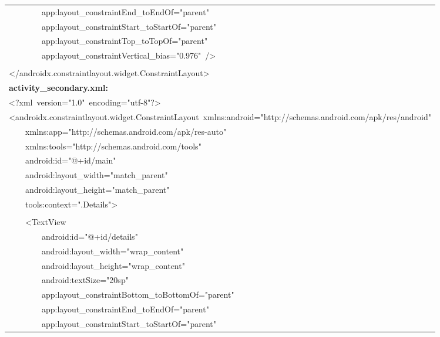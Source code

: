 \documentclass[a4paper,12pt]{article}
\begin{document}
\begin{longtable}{|p{}|}
{\ttfamily\small \ \ \ \ \ \ \ \ app:layout\_constraintEnd\_toEndOf="parent"} \\
{\ttfamily\small \ \ \ \ \ \ \ \ app:layout\_constraintStart\_toStartOf="parent"} \\
{\ttfamily\small \ \ \ \ \ \ \ \ app:layout\_constraintTop\_toTopOf="parent"} \\
{\ttfamily\small \ \ \ \ \ \ \ \ app:layout\_constraintVertical\_bias="0.976"\ /\textgreater{}} \\
\strut \\
{\ttfamily\small \textless{}/androidx.constraintlayout.widget.ConstraintLayout\textgreater{}} \\
\hline
\rule{0pt}{13pt}\textbf{activity\_secondary.xml:} \\
\hline
{\ttfamily\small \textless{}?xml\ version="1.0"\ encoding="utf-8"?\textgreater{}} \\
{\ttfamily\small \textless{}androidx.constraintlayout.widget.ConstraintLayout\ xmlns:android="http://schemas.android.com/apk/res/android"} \\
{\ttfamily\small \ \ \ \ xmlns:app="http://schemas.android.com/apk/res-auto"} \\
{\ttfamily\small \ \ \ \ xmlns:tools="http://schemas.android.com/tools"} \\
{\ttfamily\small \ \ \ \ android:id="@+id/main"} \\
{\ttfamily\small \ \ \ \ android:layout\_width="match\_parent"} \\
{\ttfamily\small \ \ \ \ android:layout\_height="match\_parent"} \\
{\ttfamily\small \ \ \ \ tools:context=".Details"\textgreater{}} \\
\strut \\
{\ttfamily\small \ \ \ \ \textless{}TextView} \\
{\ttfamily\small \ \ \ \ \ \ \ \ android:id="@+id/details"} \\
{\ttfamily\small \ \ \ \ \ \ \ \ android:layout\_width="wrap\_content"} \\
{\ttfamily\small \ \ \ \ \ \ \ \ android:layout\_height="wrap\_content"} \\
{\ttfamily\small \ \ \ \ \ \ \ \ android:textSize="20sp"} \\
{\ttfamily\small \ \ \ \ \ \ \ \ app:layout\_constraintBottom\_toBottomOf="parent"} \\
{\ttfamily\small \ \ \ \ \ \ \ \ app:layout\_constraintEnd\_toEndOf="parent"} \\
{\ttfamily\small \ \ \ \ \ \ \ \ app:layout\_constraintStart\_toStartOf="parent"} \\

\end{longtable}
\end{document}
